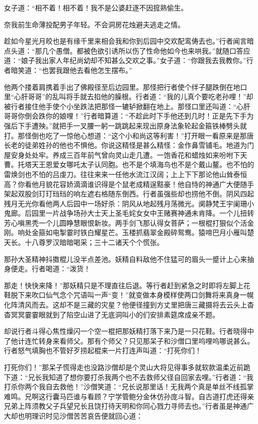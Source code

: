 \documentclass[12pt,UTF8]{ctexbook}
\begin{document}
{	女子道：“相不着！相不着！我不是公婆赶逐不因搲熟偷生。
	
	奈我前生命薄投配男子年轻。不会洞房花烛避夫逃走之情。
	
	趁如今星光月皎也是有缘千里来相会我和你到后园中交欢配鸾俦去也。”行者闻言暗点头道：“那几个愚僧。都被色欲引诱所以伤了性命他如今也来哄我。”就随口答应道：“娘子我出家人年纪尚幼却不知甚么交欢之事。”女子道：“你跟我去我教你。”行者暗笑道：“也罢我跟他去看他怎生摆布。”
	
	他两个搂着肩携着手出了佛殿径至后边园里。那怪把行者使个绊子腿跌倒在地口里“心肝哥哥”的乱叫将手就去掐他的臊根。行者道：“我的儿真个要吃老孙哩！”却被行者接住他手使个小坐跌法把那怪一辘轳掀翻在地上。那怪口里还叫道：“心肝哥哥你倒会跌你的娘哩！”行者暗算道：“不趁此时下手他还到几时！正是先下手为强后下手遭殃。”就把手一叉腰一躬一跳跳起来现出原身法象轮起金箍铁棒劈头就打。那怪倒也吃了一惊他心想道：“这个小和尚这等利害！”打开眼一看原来是那唐长老的徒弟姓孙的他也不惧他。你说这精怪是甚么精怪：金作鼻雪铺毛。地道为门屋安身处处牢。养成三百年前气曾向灵山走几遭。一饱香花和蜡烛如来吩咐下天曹。托塔天王恩爱女哪吒太子认同胞。也不是个填海鸟也不是个戴山鳌。也不怕的雷焕剑也不怕的吕虔刀。往往来来一任他水流江汉阔；上上下下那论他山耸泰恒高？你看他月貌花容娇滴滴谁识得是个鼠老成精逞黠豪！他自恃的神通广大便随手架起双股剑玎玎珰珰的响左遮右格随东倒西。行者虽强些却也捞他不倒。阴风四起残月无光你看他两人后园中一场好杀：阴风从地起残月荡微光。阒静梵王宇阑珊小鬼廊。后园里一片战争场孙大士天上圣毛姹女女中王赌赛神通未肯降。一个儿扭转芳心嗔黑秃一个儿圆睁慧眼恨新妆。两手剑飞那认得女菩萨；一根棍打狠似个活金刚。响处金箍如电掣霎时铁白耀星芒。玉楼抓翡翠金殿碎鸳鸯。猿啼巴月小雁叫楚天长。十八尊罗汉暗暗喝采；三十二诸天个个慌张。
	
	那孙大圣精神抖擞棍儿没半点差池。妖精自料敌他不住猛可的眉头一蹙计上心来抽身便走。行者喝道：“泼货！
	
	那走！快快来降！”那妖精只是不理直往后退。等行者赶到紧急之时即将左脚上花鞋脱下来吹口仙气念个咒语叫一声“变！”就变做本身模样使两口剑舞将来真身一幌化阵清风而去。这却不是三藏的灾星？他便径撞到方丈里把唐三藏摄将去云头上杳杳冥冥霎霎眼就到了陷空山进了无底洞叫小的们安排素筵席成亲不题。
	
	却说行者斗得心焦性燥闪一个空一棍把那妖精打落下来乃是一只花鞋。行者晓得中了他计连忙转身来看师父。那有个师父？只见那呆子和沙僧口里呜哩呜哪说甚么。行者怒气填胸也不管好歹捞起棍来一片打连声叫道：“打死你们！
	
	打死你们！”那呆子慌得走也没路沙僧却是个灵山大将见得事多就软款温柔近前跪下道：“兄长我知道了想你要打杀我两个也不去救师父径自回家去哩。”行者道：“我打杀你两个我自去救他！”沙僧笑道：“兄长说那里话！无我两个真是单丝不线孤掌难鸣。兄啊这行囊马匹谁与看顾？宁学管鲍分金休仿孙庞斗智。自古道打虎还得亲兄弟上阵须教父子兵望兄长且饶打待天明和你同心戮力寻师去也。”行者虽是神通广大却也明理识时见沙僧苦苦哀告便就回心道：
	
}
\end{document}
